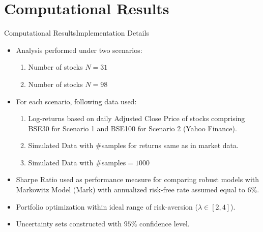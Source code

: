 \documentclass{beamer}
\begin{document}
\section{Computational Results}

\begin{frame}{Computational Results}{Implementation Details}
\begin{itemize}
    \item{Analysis performed under two scenarios:
    \begin{enumerate}
        \item{Number of stocks $N=31$}
        \item{Number of stocks $N=98$}
    \end{enumerate}
    }
    \item{For each scenario, following data used:
    \begin{enumerate}
        \item{Log-returns based on daily Adjusted Close Price of stocks comprising BSE30 for Scenario 1 and BSE100 for Scenario 2 (Yahoo Finance).}
        \item{Simulated Data with $\#$samples for returns same as in market data.}
        \item{Simulated Data with $\#$samples$=1000$}
    \end{enumerate}
    }
    \item{Sharpe Ratio used as performance measure for comparing robust models with Markowitz Model (Mark) with annualized risk-free rate assumed equal to $6\%$.}
    \item{Portfolio optimization within ideal range of risk-aversion ($\lambda \in [2,4]$). }
    \item{Uncertainty sets constructed with $95\%$ confidence level. }
\end{itemize}
\end{frame}
\end{document}
